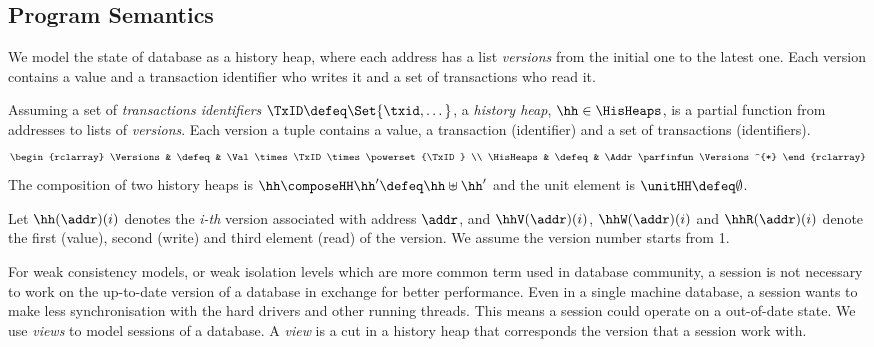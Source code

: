 \subsection{Program Semantics}

We model the state of database as a history heap, where each address has a list \emph{versions} from the initial one to the latest one.
Each version contains a value and a transaction identifier who writes it and a set of transactions who read it.

\begin{defn}
\label{def:his_heap}
Assuming a set of \emph{transactions identifiers} \( \TxID \defeq \Set{\txid, \dots}\), a \emph{history heap}, \( \hh \in \HisHeaps \), is a partial function from addresses to lists of \emph{versions}.
Each version a tuple contains a value, a transaction (identifier) and a set of transactions (identifiers).
\[
\begin{rclarray}
    \Versions & \defeq &  \Val \times \TxID \times \powerset{\TxID} \\
    \HisHeaps & \defeq & \Addr \parfinfun \Versions^{*}
\end{rclarray}
\]
The composition of two history heaps is \( \hh \composeHH \hh' \defeq \hh \uplus \hh' \) and the unit element is \( \unitHH \defeq \emptyset \). 
\end{defn}
 
Let \( \hh(\addr)(i)\) denotes the \emph{i-th} version associated with address \( \addr \), and \( \hhV(\addr)(i) \), \( \hhW(\addr)(i) \) and \( \hhR(\addr)(i) \) denote the first (value), second (write) and third element (read) of the version.
We assume the version number starts from 1.

For weak consistency models, or weak isolation levels which are more common term used in database community, a session is not necessary to work on the up-to-date version of a database in exchange for better performance. 
Even in a single machine database, a session wants to make less synchronisation with the hard drivers and other running threads.
This means a session could operate on a out-of-date state.
We use \emph{views} to model sessions of a database.
A \emph{view} is a cut in a history heap that corresponds the version that a session work with.

